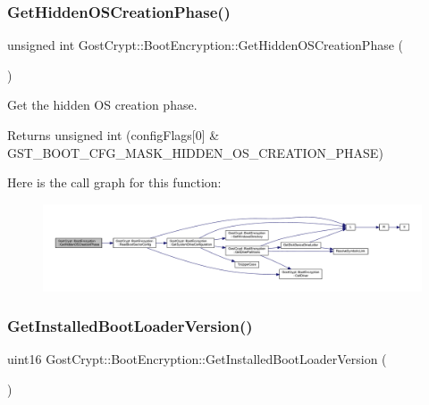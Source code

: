 \subsubsection{\texorpdfstring{Get\+Hidden\+O\+S\+Creation\+Phase()}{GetHiddenOSCreationPhase()}}
{\footnotesize\ttfamily unsigned int Gost\+Crypt\+::\+Boot\+Encryption\+::\+Get\+Hidden\+O\+S\+Creation\+Phase (\begin{DoxyParamCaption}{ }\end{DoxyParamCaption})}



Get the hidden OS creation phase. 

\begin{DoxyReturn}{Returns}
unsigned int (config\+Flags\mbox{[}0\mbox{]} \& G\+S\+T\+\_\+\+B\+O\+O\+T\+\_\+\+C\+F\+G\+\_\+\+M\+A\+S\+K\+\_\+\+H\+I\+D\+D\+E\+N\+\_\+\+O\+S\+\_\+\+C\+R\+E\+A\+T\+I\+O\+N\+\_\+\+P\+H\+A\+SE) 
\end{DoxyReturn}
Here is the call graph for this function\+:
\nopagebreak
\begin{figure}[H]
\begin{center}
\leavevmode
\includegraphics[width=350pt]{class_gost_crypt_1_1_boot_encryption_aa66b29a9ad9bd1aa8b7aece9d9eaca2c_cgraph}
\end{center}
\end{figure}
\mbox{\label{class_gost_crypt_1_1_boot_encryption_a438cec2387d7aab246d986d2a0128b21}} 
\subsubsection{\texorpdfstring{Get\+Installed\+Boot\+Loader\+Version()}{GetInstalledBootLoaderVersion()}}
{\footnotesize\ttfamily uint16 Gost\+Crypt\+::\+Boot\+Encryption\+::\+Get\+Installed\+Boot\+Loader\+Version (\begin{DoxyParamCaption}{ }\end{DoxyParamCaption})}



